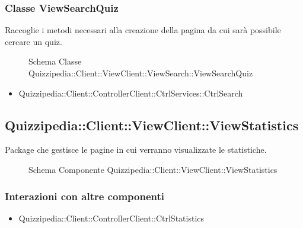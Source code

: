 \subsubsection{Classe ViewSearchQuiz}
Raccoglie i metodi necessari alla creazione della pagina da cui sarà possibile cercare un quiz.
\begin{figure}[H]
\centering
\noindent{}
\caption{Schema Classe Quizzipedia::Client::ViewClient::ViewSearch::ViewSearchQuiz}
\end{figure}
\begin{itemize}
\item Quizzipedia::Client::ControllerClient::CtrlServices::CtrlSearch
\end{itemize}
\subsection{Quizzipedia::Client::ViewClient::ViewStatistics}
Package che gestisce le pagine in cui verranno visualizzate le statistiche.
\begin{figure}[H]
\centering
\noindent{}
\caption[Quizzipedia::Client::ViewClient::ViewStatistics]{Schema Componente Quizzipedia::Client::ViewClient::ViewStatistics}
\end{figure}
\subsubsection{Interazioni con altre componenti}
\begin{itemize}
\item Quizzipedia::Client::ControllerClient::CtrlStatistics
\end{itemize}
